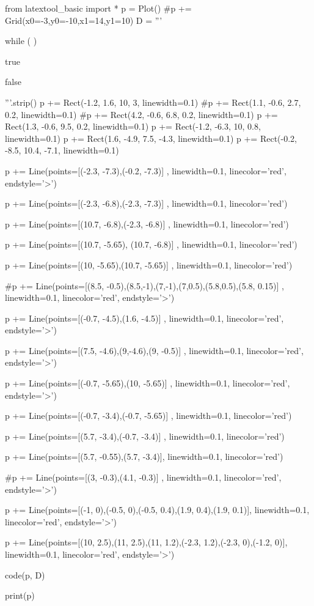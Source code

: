 
\begin{python}
from latextool_basic import *
p = Plot()
#p += Grid(x0=-3,y0=-10,x1=14,y1=10)
D = '''





while (                                         )








true



false






'''.strip()
p += Rect(-1.2, 1.6, 10, 3, linewidth=0.1)
#p += Rect(1.1, -0.6, 2.7, 0.2, linewidth=0.1)
#p += Rect(4.2, -0.6, 6.8, 0.2, linewidth=0.1)
p += Rect(1.3, -0.6, 9.5, 0.2, linewidth=0.1)
p += Rect(-1.2, -6.3, 10, 0.8, linewidth=0.1)
p += Rect(1.6, -4.9, 7.5, -4.3, linewidth=0.1)
p += Rect(-0.2, -8.5, 10.4, -7.1, linewidth=0.1)

p += Line(points=[(-2.3, -7.3),(-0.2, -7.3)] , linewidth=0.1, linecolor='red', endstyle='>')

p += Line(points=[(-2.3, -6.8),(-2.3, -7.3)] , linewidth=0.1, linecolor='red')

p += Line(points=[(10.7, -6.8),(-2.3, -6.8)] , linewidth=0.1, linecolor='red')

p += Line(points=[(10.7, -5.65), (10.7, -6.8)] , linewidth=0.1, linecolor='red')

p += Line(points=[(10, -5.65),(10.7, -5.65)] , linewidth=0.1, linecolor='red')

#p += Line(points=[(8.5, -0.5),(8.5,-1),(7,-1),(7,0.5),(5.8,0.5),(5.8, 0.15)] , linewidth=0.1, linecolor='red', endstyle='>')

p += Line(points=[(-0.7, -4.5),(1.6, -4.5)] , linewidth=0.1, linecolor='red', endstyle='>')

p += Line(points=[(7.5, -4.6),(9,-4.6),(9, -0.5)] , linewidth=0.1, linecolor='red', endstyle='>')

p += Line(points=[(-0.7, -5.65),(10, -5.65)] , linewidth=0.1, linecolor='red', endstyle='>')

p += Line(points=[(-0.7, -3.4),(-0.7, -5.65)] , linewidth=0.1, linecolor='red')

p += Line(points=[(5.7, -3.4),(-0.7, -3.4)] , linewidth=0.1, linecolor='red')

p += Line(points=[(5.7, -0.55),(5.7, -3.4)], linewidth=0.1, linecolor='red')

#p += Line(points=[(3, -0.3),(4.1, -0.3)] , linewidth=0.1, linecolor='red', endstyle='>')

p += Line(points=[(-1, 0),(-0.5, 0),(-0.5, 0.4),(1.9, 0.4),(1.9, 0.1)], linewidth=0.1, linecolor='red', endstyle='>')

p += Line(points=[(10, 2.5),(11, 2.5),(11, 1.2),(-2.3, 1.2),(-2.3, 0),(-1.2, 0)], linewidth=0.1, linecolor='red', endstyle='>')


code(p, D)

print(p)
\end{python}

